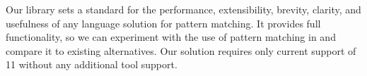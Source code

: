 
\noindent
Our library sets a standard for the performance, extensibility, brevity, 
clarity, and usefulness of any language solution for pattern matching.
It provides full functionality, so we can experiment with the use of 
pattern matching in \Cpp{} and compare it to existing alternatives.
Our solution requires only current support of \Cpp{}11 without any 
additional tool support.

